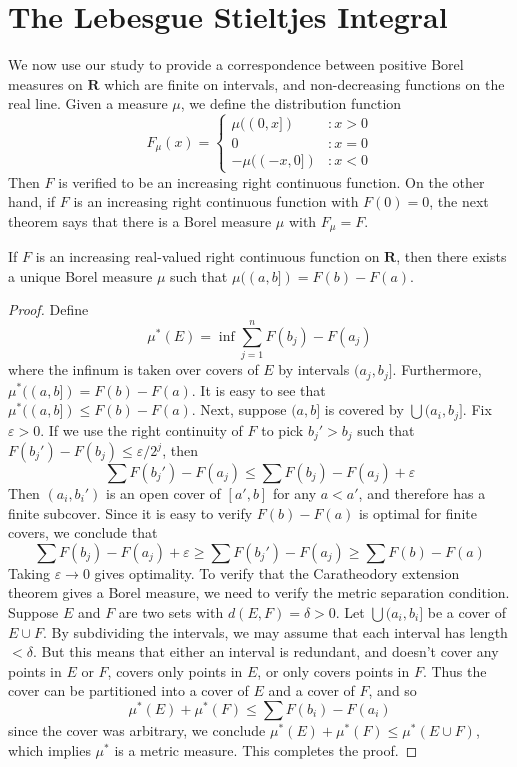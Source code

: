 \section{The Lebesgue Stieltjes Integral}

We now use our study to provide a correspondence between positive Borel measures on $\mathbf{R}$ which are finite on intervals, and non-decreasing functions on the real line. Given a measure $\mu$, we define the distribution function
%
\[ F_\mu(x) = \begin{cases} \mu((0,x]) & : x > 0 \\ 0 & : x = 0\\ - \mu((-x, 0]) & : x < 0 \end{cases} \]
%
Then $F$ is verified to be an increasing right continuous function. On the other hand, if $F$ is an increasing right continuous function with $F(0) = 0$, the next theorem says that there is a Borel measure $\mu$ with $F_\mu = F$.

\begin{theorem}
    If $F$ is an increasing real-valued right continuous function on $\mathbf{R}$, then there exists a unique Borel measure $\mu$ such that $\mu((a,b]) = F(b) - F(a)$.
\end{theorem}
\begin{proof}
    Define
    \[ \mu^*(E) = \inf \sum_{j = 1}^n F(b_j) - F(a_j) \]
    where the infinum is taken over covers of $E$ by intervals $(a_j,b_j]$. Furthermore, $\mu^*((a,b]) = F(b) - F(a)$. It is easy to see that $\mu^*((a,b]) \leq F(b) - F(a)$. Next, suppose $(a,b]$ is covered by $\bigcup (a_i,b_j]$. Fix $\varepsilon > 0$. If we use the right continuity of $F$ to pick $b_j' > b_j$ such that $F(b_j') - F(b_j) \leq \varepsilon/2^j$, then
    \[ \sum F(b_j') - F(a_j) \leq \sum F(b_j) - F(a_j) + \varepsilon \]
    Then $(a_i,b_i')$ is an open cover of $[a',b]$ for any $a < a'$, and therefore has a finite subcover. Since it is easy to verify $F(b) - F(a)$ is optimal for finite covers, we conclude that
    \[ \sum F(b_j) - F(a_j) + \varepsilon \geq \sum F(b_j') - F(a_j) \geq \sum F(b) - F(a) \]
    Taking $\varepsilon \to 0$ gives optimality. To verify that the Caratheodory extension theorem gives a Borel measure, we need to verify the metric separation condition. Suppose $E$ and $F$ are two sets with $d(E,F) = \delta > 0$. Let $\bigcup (a_i,b_i]$ be a cover of $E \cup F$. By subdividing the intervals, we may assume that each interval has length $< \delta$. But this means that either an interval is redundant, and doesn't cover any points in $E$ or $F$, covers only points in $E$, or only covers points in $F$. Thus the cover can be partitioned into a cover of $E$ and a cover of $F$, and so
    \[ \mu^*(E) + \mu^*(F) \leq \sum F(b_i) - F(a_i) \]
    since the cover was arbitrary, we conclude $\mu^*(E) + \mu^*(F) \leq \mu^*(E \cup F)$, which implies $\mu^*$ is a metric measure. This completes the proof.
\end{proof}

